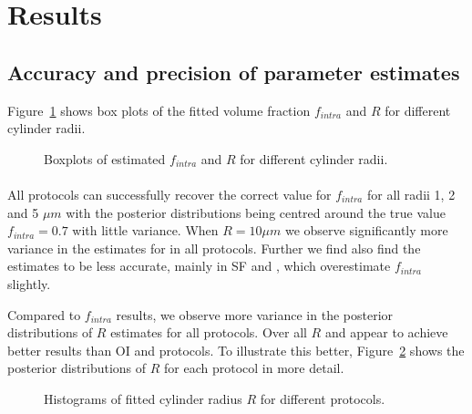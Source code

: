 \FloatBarrier

\section{Results}
\subsection{Accuracy and precision of parameter estimates}
Figure~\ref{fig:chapter7 exp1 boxplots 60mT} shows box plots of the fitted volume fraction $f_{intra}$ and $R$ for different cylinder radii.
\begin{figure}[H]
	\centering
	
	
	\caption{Boxplots of estimated $f_{intra}$ and $R$ for different cylinder radii.}
	\label{fig:chapter7 exp1 boxplots 60mT}
\end{figure}


\paragraph{} All protocols can successfully recover the correct value for $f_{intra}$ for all radii 1, 2 and 5 $\mu m$ with the posterior distributions being centred around the true value $f_{intra}=0.7$ with little variance. When $R=10\mu m$ we observe significantly more variance in the estimates for in all protocols. Further we find also find the estimates to be less accurate, mainly in {\gls{SF}} and {\SD}, which overestimate $f_{intra}$ slightly.


Compared to $f_{intra}$ results, we observe more variance in the posterior distributions of $R$ estimates for all protocols. Over all $R$ {\DO} and {\FD} appear to achieve better results than {\gls{OI}} and {\SD} protocols. To illustrate this better, Figure~\ref{fig:chapter7 exp1 histograms 60mT} shows the posterior distributions of $R$ for each protocol in more detail.

\begin{figure}[H]
	 \centering
	 
	 \caption{Histograms of fitted cylinder radius $R$ for different protocols.}
	 \label{fig:chapter7 exp1 histograms 60mT}
\end{figure}

